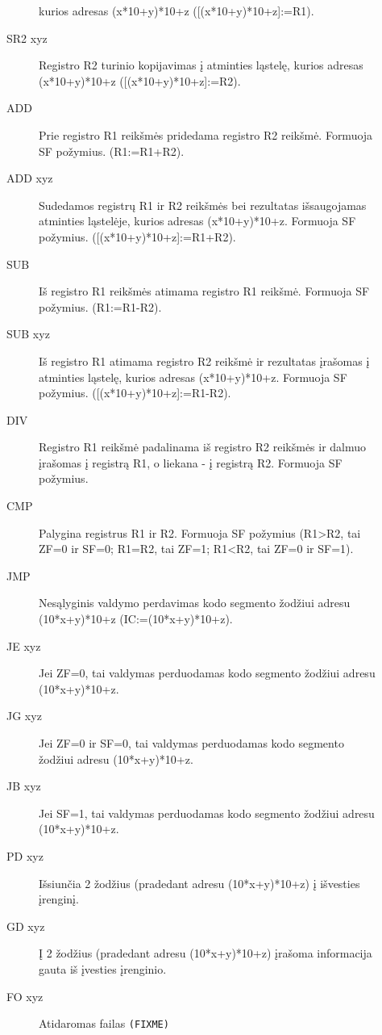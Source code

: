 \begin{description}
\begin{description}
          kurios adresas (x*10+y)*10+z ([(x*10+y)*10+z]:=R1).
        \item[SR2 xyz] Registro R2 turinio kopijavimas į atminties ląstelę,
          kurios adresas (x*10+y)*10+z ([(x*10+y)*10+z]:=R2).
        \item[ADD] Prie registro R1 reikšmės pridedama registro R2 reikšmė.
          Formuoja SF požymius. (R1:=R1+R2).
        \item[ADD xyz] Sudedamos registrų R1 ir R2 reikšmės bei rezultatas 
          išsaugojamas atminties ląstelėje, kurios adresas (x*10+y)*10+z.
          Formuoja SF požymius. ([(x*10+y)*10+z]:=R1+R2).
        \item[SUB] Iš registro R1 reikšmės atimama registro R1 reikšmė. 
          Formuoja SF požymius.
          (R1:=R1-R2).
        \item[SUB xyz] Iš registro R1 atimama registro R2 reikšmė ir 
          rezultatas įrašomas į atminties ląstelę, kurios adresas 
          (x*10+y)*10+z. Formuoja SF požymius. ([(x*10+y)*10+z]:=R1-R2).
        \item[DIV] Registro R1 reikšmė padalinama iš registro R2 reikšmės ir
          dalmuo įrašomas į registrą R1, o liekana - į registrą R2. Formuoja
          SF požymius.
        \item[CMP] Palygina registrus R1 ir R2. Formuoja SF požymius
          (R1>R2, tai ZF=0 ir SF=0; R1=R2, tai ZF=1; R1<R2, tai ZF=0 
          ir SF=1).
        \item[JMP] Nesąlyginis valdymo perdavimas kodo segmento žodžiui
          adresu (10*x+y)*10+z (IC:=(10*x+y)*10+z).
        \item[JE xyz] Jei ZF=0, tai valdymas perduodamas kodo segmento 
          žodžiui adresu (10*x+y)*10+z.
        \item[JG xyz] Jei ZF=0 ir SF=0, tai valdymas perduodamas kodo
          segmento žodžiui adresu (10*x+y)*10+z.
        \item[JB xyz] Jei SF=1, tai valdymas perduodamas kodo segmento
          žodžiui adresu (10*x+y)*10+z.
        \item[PD xyz] Išsiunčia 2 žodžius (pradedant adresu (10*x+y)*10+z)
          į išvesties įrenginį.
        \item[GD xyz] Į 2 žodžius (pradedant adresu (10*x+y)*10+z) 
          įrašoma informacija gauta iš įvesties įrenginio.
        \item[FO xyz] Atidaromas failas \verb|(FIXME)|%

\end{description}
\end{description}

